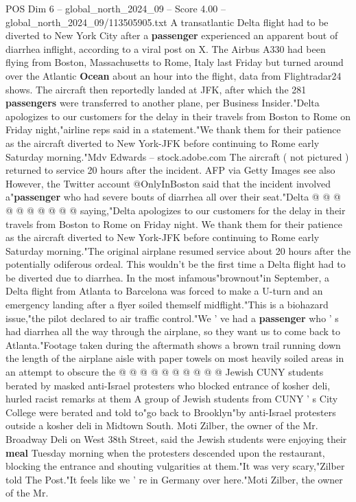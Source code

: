 \begin{textsample}{POS Dim 6 – global\_north\_2024\_09 – Score 4.00 – global\_north\_2024\_09/113505905.txt}  \label{ex:f6_pos_368}
A transatlantic Delta flight had to be diverted to New York City after a \textbf{passenger} experienced an apparent bout of diarrhea inflight, according to a viral post on X.
The Airbus A330 had been flying from Boston, Massachusetts to Rome, Italy last Friday but turned around over the Atlantic \textbf{Ocean} about an hour into the flight, data from Flightradar24 shows.
The aircraft then reportedly landed at JFK, after which the 281 \textbf{passengers} were transferred to another plane, per Business Insider."Delta apologizes to our customers for the delay in their travels from Boston to Rome on Friday night,"airline reps said in a statement."We thank them for their patience as the aircraft diverted to New York-JFK before continuing to Rome early Saturday morning."Mdv Edwards -- stock.adobe.com The aircraft ( not pictured ) returned to service 20 hours after the incident.
AFP via Getty Images see also However, the Twitter account @OnlyInBoston said that the incident involved a"\textbf{passenger} who had severe bouts of diarrhea all over their seat."Delta @ @ @ @ @ @ @ @ @ @ saying,"Delta apologizes to our customers for the delay in their travels from Boston to Rome on Friday night.
We thank them for their patience as the aircraft diverted to New York-JFK before continuing to Rome early Saturday morning."The original airplane resumed service about 20 hours after the potentially odiferous ordeal.
This wouldn't be the first time a Delta flight had to be diverted due to diarrhea.
In the most infamous"brownout"in September, a Delta flight from Atlanta to Barcelona was forced to make a U-turn and an emergency landing after a flyer soiled themself midflight."This is a biohazard issue,"the pilot declared to air traffic control."We ' ve had a \textbf{passenger} who ' s had diarrhea all the way through the airplane, so they want us to come back to Atlanta."Footage taken during the aftermath shows a brown trail running down the length of the airplane aisle with paper towels on most heavily soiled areas in an attempt to obscure the @ @ @ @ @ @ @ @ @ @ Jewish CUNY students berated by masked anti-Israel protesters who blocked entrance of kosher deli, hurled racist remarks at them A group of Jewish students from CUNY ' s City College were berated and told to"go back to Brooklyn"by anti-Israel protesters outside a kosher deli in Midtown South.
Moti Zilber, the owner of the Mr.
Broadway Deli on West 38th Street, said the Jewish students were enjoying their \textbf{meal} Tuesday morning when the protesters descended upon the restaurant, blocking the entrance and shouting vulgarities at them."It was very scary,"Zilber told The Post."It feels like we ' re in Germany over here."Moti Zilber, the owner of the Mr.

\end{textsample}
